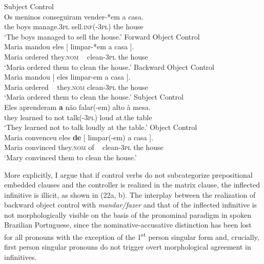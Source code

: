 \documentclass[output=paper]{langsci/langscibook}
\begin{document}
\ea%
    \label{ex:moreno:22}
    \ea  Subject Control\\ 
    \gll Os meninos  conseguiram  vender-*em   a casa.  \\
         the boys  manage.\textsc{3pl}   sell.\textsc{inf}(-\textsc{3pl}) the house\\
    \glt ‘The boys managed to sell the house.’
    \ex  Forward Object Control\\
    \gll Maria mandou   eles    [ limpar-*em a    casa ].    \\
         Maria ordered    they.\textsc{nom}  ~ clean{}-\textsc{3pl}     the house\\
    \glt ‘Maria ordered them  to clean the house.’
    \ex  Backward Object Control\\
    \gll Maria mandou       [ eles limpar-em a        casa ].    \\
         Maria ordered      ~    they.\textsc{nom}   clean{}-\textsc{3pl}     the house\\
    \glt ‘Maria ordered them to clean the house.’
    \z
\z
\ea%
    \label{ex:moreno:23}
    \ea  Subject Control\\
    \gll Eles     aprenderam \textbf{a}  não   falar(-em)  alto  à        mesa.\\
         they    learned         to not    talk({}-\textsc{3pl})    loud at.the table  \\
    \glt ‘They learned not to talk loudly at the table.’
    \ex  Object Control\\
    \gll Maria  convenceu eles          \textbf{de}  [  limpar(-em) a    casa ].     \\
         Maria  convinced they.\textsc{nom} of    ~ clean-\textsc{3pl}     the house\\
    \glt ‘Mary convinced them to clean the house.’
    \z
\z

More explicitly, I argue that if control verbs do not subcategorize prepositional embedded clauses and the controller is realized in the matrix clause, the inflected infinitive is illicit, as shown in (22a, b). The interplay between the realization of backward object control with \textit{mandar\slash fazer} and that of the inflected infinitive is not morphologically visible on the basis of the pronominal paradigm in spoken Brazilian Portuguese, since the nominative-accusative distinction has been lost for all pronouns with the exception of the 1\textsuperscript{st} person singular form and, crucially, first person singular pronouns do not trigger overt morphological agreement in infinitives. 
\end{document}
